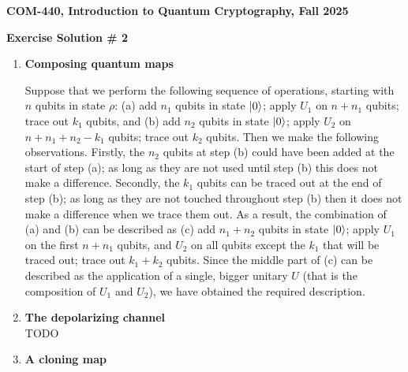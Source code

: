 \documentclass[12pt]{article}
\newcommand{\header}[1]{\begin{center} {\large\bf #1} \end{center}}
\begin{document}
\header{COM-440, Introduction to Quantum Cryptography, Fall 2025}
\header{\bf Exercise Solution \# 2}


\begin{enumerate}

\item {\bf Composing quantum maps}

Suppose that we perform the following sequence of operations, starting with $n$ qubits in state $\rho$: (a) add $n_1$ qubits in state $\ket{0}$; apply $U_1$ on $n+n_1$ qubits; trace out $k_1$ qubits, and (b) add $n_2$ qubits in state $\ket{0}$; apply $U_2$ on $n+n_1+n_2-k_1$ qubits; trace out $k_2$ qubits. Then we make the following observations. Firstly, the $n_2$ qubits at step (b) could have been added at the start of step (a); as long as they are not used until step (b) this does not make a difference. Secondly, the $k_1$ qubits can be traced out at the end of step (b); as long as they are not touched throughout step (b) then it does not make a difference when we trace them out. As a result, the combination of (a) and (b) can be described as (c) add $n_1+n_2$ qubits in state $\ket{0}$; apply $U_1$ on the first $n+n_1$ qubits, and $U_2$ on all qubits except the $k_1$ that will be traced out; trace out $k_1+k_2$ qubits. Since the middle part of (c) can be described as the application of a single, bigger unitary $U$ (that is the composition of $U_1$ and $U_2$), we have obtained the required description. 


\item {\bf The depolarizing channel}\\
TODO
	
\item {\bf A cloning map}\label{ex:2-qmamp}


\end{enumerate}
\end{document}
